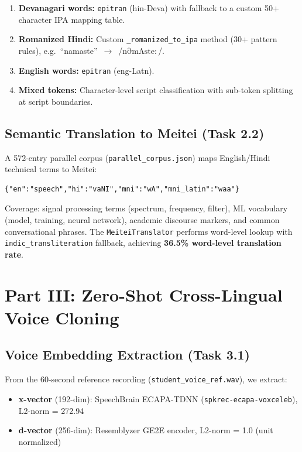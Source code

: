 \documentclass[11pt]{article}
\begin{document}
\begin{enumerate}
  \item \textbf{Devanagari words:} \texttt{epitran} (hin-Deva) with fallback
        to a custom 50+ character IPA mapping table.
  \item \textbf{Romanized Hindi:} Custom \texttt{\_romanized\_to\_ipa} method
        (30+ pattern rules), e.g.\ ``namaste''~$\to$~/$\mathrm{n\partial m\Lambda ste:}$/.
  \item \textbf{English words:} \texttt{epitran} (eng-Latn).
  \item \textbf{Mixed tokens:} Character-level script classification with
        sub-token splitting at script boundaries.
\end{enumerate}

\subsection{Semantic Translation to Meitei (Task 2.2)}

A 572-entry parallel corpus (\texttt{parallel\_corpus.json}) maps
English/Hindi technical terms to Meitei:

\begin{lstlisting}
{"en":"speech","hi":"vaNI","mni":"wA","mni_latin":"waa"}
\end{lstlisting}

Coverage: signal processing terms (spectrum, frequency, filter), ML
vocabulary (model, training, neural network), academic discourse markers,
and common conversational phrases. The \texttt{MeiteiTranslator} performs
word-level lookup with \texttt{indic\_transliteration} fallback, achieving
\textbf{36.5\% word-level translation rate}.

\section{Part III: Zero-Shot Cross-Lingual Voice Cloning}

\subsection{Voice Embedding Extraction (Task 3.1)}

From the 60-second reference recording (\texttt{student\_voice\_ref.wav}),
we extract:
\begin{itemize}
  \item \textbf{x-vector} (192-dim): SpeechBrain ECAPA-TDNN
        (\texttt{spkrec-ecapa-voxceleb}), L2-norm = 272.94
  \item \textbf{d-vector} (256-dim): Resemblyzer GE2E encoder,
        L2-norm = 1.0 (unit normalized)
\end{itemize}
\end{document}
